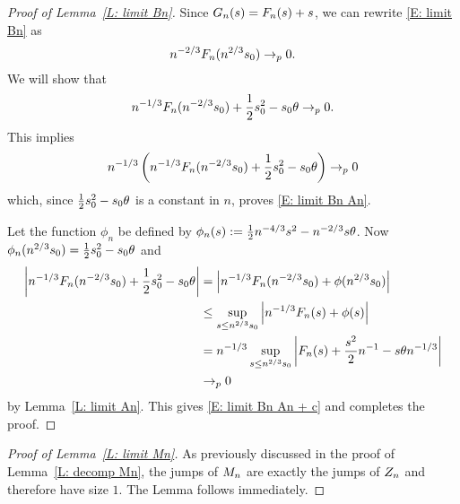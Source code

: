 \begin{proof}[Proof of Lemma~\ref{L: limit Bn}] \label{P: limit Bn}
	Since $G_n(s) = F_n(s) + s$, we can rewrite \eqref{E: limit Bn} as
	\begin{equation} \label{E: limit Bn An}
	n^{-2 / 3} F_n(n^{2 / 3}s_0) \rightarrow_p 0.
	\end{equation}
	We will show that
	\begin{equation} \label{E: limit Bn An + c}
	n^{-1 / 3} F_n(n^{-2 / 3}s_0) + \frac{1}{2}s_0^2 - s_0\theta \rightarrow_p 0.
	\end{equation}
	This implies
	\begin{equation*}
	n^{-1 / 3} \left( n^{-1 / 3} F_n(n^{-2 / 3}s_0) + \frac{1}{2}s_0^2 - s_0\theta \right) \rightarrow_p 0
	\end{equation*}
	which, since $\frac{1}{2}s_0^2 - s_0\theta$ is a constant in $n$, proves \eqref{E: limit Bn An}.
	
	Let the function $\phi_n$ be defined by $\phi_n(s) := \frac{1}{2}n^{-4 / 3}s^2 - n^{-2 / 3}s\theta$.	
	Now $\phi_n(n^{2 / 3}s_0) = \frac{1}{2}s_0^2 - s_0\theta$ and
	\begin{align*}
	\left| n^{-1 / 3} F_n(n^{-2 / 3}s_0) + \frac{1}{2}s_0^2 - s_0\theta \right| 
	&= \left| n^{-1 / 3} F_n(n^{-2 / 3}s_0) + \phi(n^{2 / 3}s_0) \right| \\
	&\leq \sup_{s \leq n^{2 / 3} s_0 } \left| n^{-1 / 3} F_n(s) + \phi(s) \right| \\
	&= n^{-1 / 3} \sup_{s \leq n^{2 / 3} s_0 } \left| F_n(s) + \frac{s^2}{2}n^{-1} - s\theta n^{-1 / 3} \right| \\
	&\rightarrow_p 0
	\end{align*}
	by Lemma~\ref{L: limit An}. This gives \eqref{E: limit Bn An + c} and completes the proof.
\end{proof}


\begin{proof}[Proof of Lemma~\ref{L: limit Mn}] \label{P: limit Mn}
	As previously discussed in the proof of Lemma~\ref{L: decomp Mn}, 
	the jumps of $M_n$ are exactly the jumps of $Z_n$ and therefore have size $1$. 
	The Lemma follows immediately.
\end{proof}

